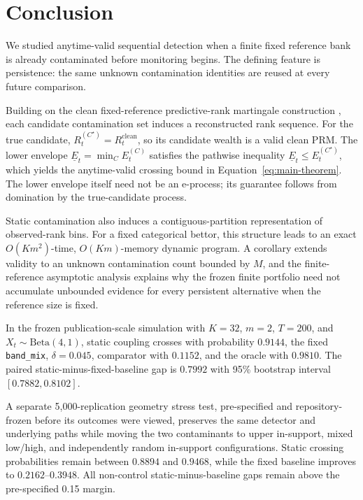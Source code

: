 \section{Conclusion}

We studied anytime-valid sequential detection when a finite fixed reference bank is already contaminated before monitoring begins. The defining feature is persistence: the same unknown contamination identities are reused at every future comparison.

Building on the clean fixed-reference predictive-rank martingale construction \cite{KuangXia2026}, each candidate contamination set induces a reconstructed rank sequence. For the true candidate, \(R_t^{(C^\star)}=R_t^{\mathrm{clean}}\), so its candidate wealth is a valid clean PRM. The lower envelope \(\underline E_t=\min_C E_t^{(C)}\) satisfies the pathwise inequality \(\underline E_t\le E_t^{(C^\star)}\), which yields the anytime-valid crossing bound in Equation~\eqref{eq:main-theorem}. The lower envelope itself need not be an e-process; its guarantee follows from domination by the true-candidate process.

Static contamination also induces a contiguous-partition representation of observed-rank bins. For a fixed categorical bettor, this structure leads to an exact \(O(Km^2)\)-time, \(O(Km)\)-memory dynamic program. A corollary extends validity to an unknown contamination count bounded by \(M\), and the finite-reference asymptotic analysis explains why the frozen finite portfolio need not accumulate unbounded evidence for every persistent alternative when the reference size is fixed.

In the frozen publication-scale simulation with \(K=32\), \(m=2\), \(T=200\), and \(X_t\sim\mathrm{Beta}(4,1)\), static coupling crosses with probability \(0.9144\), the fixed \texttt{band\_mix}, \(\delta=0.045\), comparator with \(0.1152\), and the oracle with \(0.9810\). The paired static-minus-fixed-baseline gap is \(0.7992\) with 95\% bootstrap interval \([0.7882,0.8102]\).

A separate 5,000-replication geometry stress test, pre-specified and repository-frozen before its outcomes were viewed, preserves the same detector and underlying paths while moving the two contaminants to upper in-support, mixed low/high, and independently random in-support configurations. Static crossing probabilities remain between \(0.8894\) and \(0.9468\), while the fixed baseline improves to \(0.2162\)--\(0.3948\). All non-control static-minus-baseline gaps remain above the pre-specified 0.15 margin.


